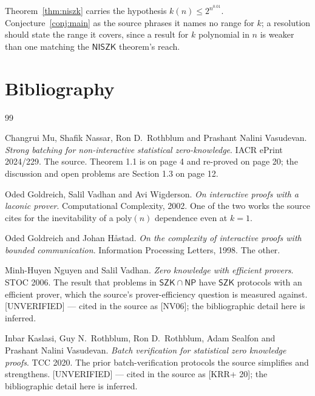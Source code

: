 \documentclass{conjura-conjecture}
\newcommand{\NISZK}{\mathsf{NISZK}}
\newcommand{\SZK}{\mathsf{SZK}}
\begin{document}
\begin{remark}\label{rem:krange}
Theorem~\ref{thm:niszk} carries the hypothesis $k(n) \le 2^{n^{0.01}}$.
Conjecture~\ref{conj:main} as the source phrases it names no range for
$k$; a resolution should state the range it covers, since a result for
$k$ polynomial in $n$ is weaker than one matching the $\NISZK$ theorem's
reach.
\end{remark}

\section{Bibliography}

\begin{conjurabibliography}{99}

Changrui Mu, Shafik Nassar, Ron D.\ Rothblum and Prashant Nalini
Vasudevan.
\emph{Strong batching for non-interactive statistical zero-knowledge}.
IACR ePrint 2024/229.
The source. Theorem 1.1 is on page 4 and re-proved on page 20; the
discussion and open problems are Section 1.3 on page 12.

Oded Goldreich, Salil Vadhan and Avi Wigderson.
\emph{On interactive proofs with a laconic prover}.
Computational Complexity, 2002.
One of the two works the source cites for the inevitability of a
$\mathrm{poly}(n)$ dependence even at $k = 1$.

Oded Goldreich and Johan H\r{a}stad.
\emph{On the complexity of interactive proofs with bounded
communication}.
Information Processing Letters, 1998.
The other.

Minh-Huyen Nguyen and Salil Vadhan.
\emph{Zero knowledge with efficient provers}.
STOC 2006.
The result that problems in $\SZK \cap \mathsf{NP}$ have $\SZK$ protocols
with an efficient prover, which the source's prover-efficiency question
is measured against. [UNVERIFIED] --- cited in the source as [NV06]; the
bibliographic detail here is inferred.

Inbar Kaslasi, Guy N.\ Rothblum, Ron D.\ Rothblum, Adam Sealfon and
Prashant Nalini Vasudevan.
\emph{Batch verification for statistical zero knowledge proofs}.
TCC 2020.
The prior batch-verification protocols the source simplifies and
strengthens. [UNVERIFIED] --- cited in the source as [KRR+ 20]; the
bibliographic detail here is inferred.

\end{conjurabibliography}
\end{document}
